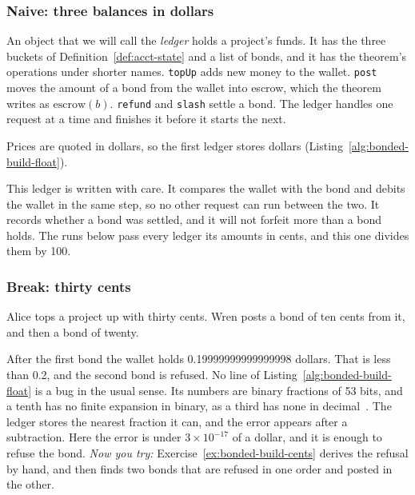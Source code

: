 \subsubsection{Naive: three balances in dollars}

An object that we will call the \emph{ledger} holds a project's funds. It
has the three buckets of Definition~\ref{def:acct-state} and a list of
bonds, and it has the theorem's operations under shorter names.
\texttt{topUp} adds new money to the wallet. \texttt{post} moves the
amount of a bond from the wallet into escrow, which the theorem writes as
$\mathrm{escrow}(b)$. \texttt{refund} and \texttt{slash} settle a bond.
The ledger handles one request at a time and finishes it before it starts
the next.

Prices are quoted in dollars, so the first ledger stores dollars
(Listing~\ref{alg:bonded-build-float}).


This ledger is written with care. It compares the wallet with the bond and
debits the wallet in the same step, so no other request can run between
the two. It records whether a bond was settled, and it will not forfeit
more than a bond holds. The runs below pass every ledger its amounts in
cents, and this one divides them by 100.

\subsubsection{Break: thirty cents}

Alice tops a project up with thirty cents. Wren posts a bond of ten cents
from it, and then a bond of twenty.


After the first bond the wallet holds 0.19999999999999998 dollars. That is
less than 0.2, and the second bond is refused. No line of
Listing~\ref{alg:bonded-build-float} is a bug in the usual sense. Its
numbers are binary fractions of 53 bits, and a tenth has no finite
expansion in binary, as a third has none in
decimal~. The ledger stores the nearest
fraction it can, and the error appears after a subtraction. Here the
error is under $3\times10^{-17}$ of a dollar, and it is enough to refuse
the bond. \emph{Now you try:} Exercise~\ref{ex:bonded-build-cents} derives
the refusal by hand, and then finds two bonds that are refused in one
order and posted in the other.

